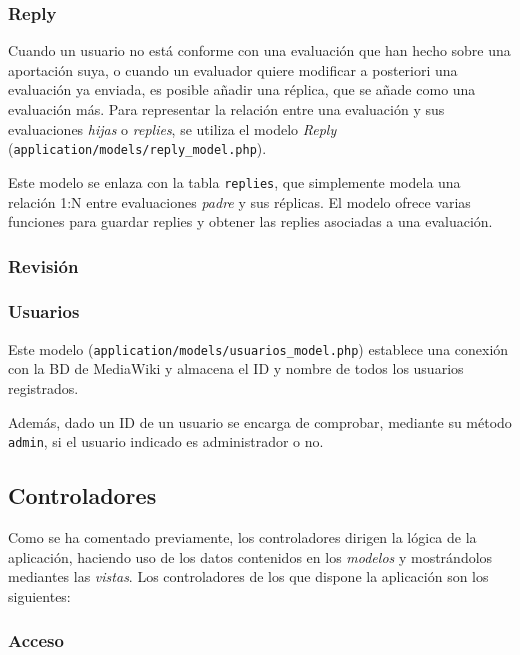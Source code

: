 \documentclass[11pt]{article}
\begin{document}
\subsubsection{Reply}

Cuando un usuario no está conforme con una evaluación que han hecho sobre una
aportación suya, o cuando un evaluador quiere modificar a posteriori una
evaluación ya enviada, es posible añadir una réplica, que se añade como una
evaluación más. Para representar la relación entre una evaluación y sus
evaluaciones \textit{hijas} o \textit{replies}, se utiliza el modelo
\textit{Reply} (\texttt{application/models/reply\_model.php}).

Este modelo se enlaza con la tabla \texttt{replies}, que simplemente modela una
relación 1:N entre evaluaciones \textit{padre} y sus réplicas. El modelo ofrece
varias funciones para guardar replies y obtener las replies asociadas a una
evaluación.

\subsubsection{Revisión}

\subsubsection{Usuarios}

Este modelo (\texttt{application/models/usuarios\_model.php}) establece una
conexión con la BD de MediaWiki y almacena el ID y nombre de todos los usuarios
registrados.

Además, dado un ID de un usuario se encarga de comprobar, mediante su método
\texttt{admin}, si el usuario indicado es administrador o no.


\subsection{Controladores}

Como se ha comentado previamente, los controladores dirigen la lógica de la
aplicación, haciendo uso de los datos contenidos en los \textit{modelos} y
mostrándolos mediantes las \textit{vistas}. Los controladores de los que dispone
la aplicación son los siguientes:

\subsubsection{Acceso}
\end{document}
